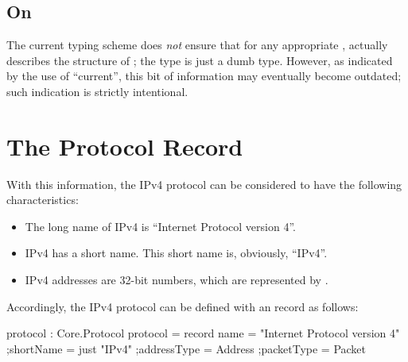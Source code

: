 \documentclass{report}
\begin{document}
\subsection{On }
The current typing scheme does \emph{not} ensure that for any appropriate ,   actually describes the structure of  ; the  type is just a dumb  type.  However, as indicated by the use of ``current'', this bit of information may eventually become outdated; such indication is strictly intentional.

\section{The Protocol Record}
With this information, the IPv4 protocol can be considered to have the following characteristics:
\begin{itemize}
	\item The long name of IPv4 is ``Internet Protocol version 4''.
	\item IPv4 has a short name.  This short name is, obviously, ``IPv4''.
	\item IPv4 addresses are 32-bit numbers, which are represented by .
\end{itemize}

Accordingly, the IPv4 protocol can be defined with an  record as follows:

\begin{code}
  protocol : Core.Protocol
  protocol = record
    {name = "Internet Protocol version 4"
    ;shortName = just "IPv4"
    ;addressType = Address
    ;packetType = Packet
    }
\end{code}
\end{document}
